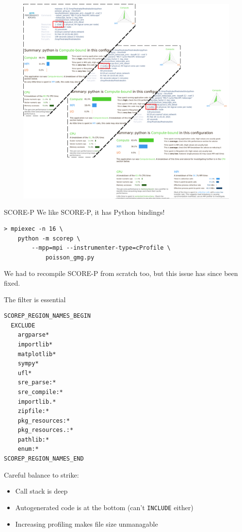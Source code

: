 \documentclass[pdf,aspectratio=169]{beamer}
\begin{document}
\begin{frame}
\begin{figure}
	\includegraphics[width=\textheight]{ddt_all.png}
\end{figure}
\end{frame}

\begin{frame}[fragile]{SCORE-P}
We like SCORE-P, it has Python bindings!
\begin{lstlisting}
> mpiexec -n 16 \
    python -m scorep \
        --mpp=mpi --instrumenter-type=cProfile \
            poisson_gmg.py
\end{lstlisting}
We had to recompile SCORE-P from scratch too, but this issue has since been fixed.
\end{frame}

\begin{frame}[fragile]
The filter is essential
\begin{lstlisting}
SCOREP_REGION_NAMES_BEGIN
  EXCLUDE
    argparse*
    importlib*
    matplotlib*
    sympy*
    ufl*
    sre_parse:*
    sre_compile:*
    importlib.*
    zipfile:*
    pkg_resources:*
    pkg_resources.:*
    pathlib:*
    enum:*
SCOREP_REGION_NAMES_END
\end{lstlisting}
\vspace{-2em}
Careful balance to strike:
\begin{itemize}
	\item Call stack is deep
	\item Autogenerated code is at the bottom (can't \verb`INCLUDE` either)
	\item Increasing profiling makes file size unmanagable
\end{itemize}
\end{frame}
\end{document}
